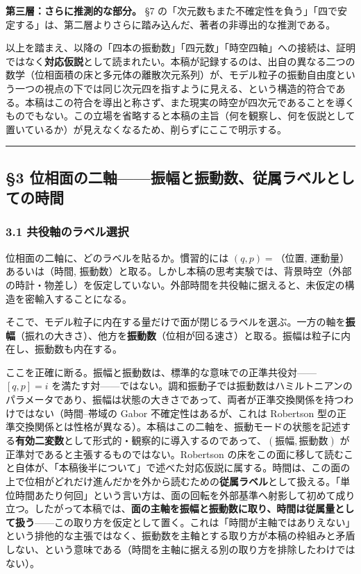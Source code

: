 \documentclass[
]{ltjsarticle}
\begin{document}
\textbf{第三層：さらに推測的な部分。} §7
の「次元数もまた不確定性を負う」「四で安定する」は、第二層よりさらに踏み込んだ、著者の非導出的な推測である。

以上を踏まえ、以降の「四本の振動数」「四元数」「時空四軸」への接続は、証明ではなく\textbf{対応仮説}として読まれたい。本稿が記録するのは、出自の異なる二つの数学（位相面積の床と多元体の離散次元系列）が、モデル粒子の振動自由度という一つの視点の下では同じ次元四を指すように見える、という構造的符合である。本稿はこの符合を導出と称さず、また現実の時空が四次元であることを導くものでもない。この立場を省略すると本稿の主旨（何を観察し、何を仮説として置いているか）が見えなくなるため、削らずにここで明示する。

\begin{center}\rule{0.5\linewidth}{0.5pt}\end{center}

\subsection{§3
位相面の二軸------振幅と振動数、従属ラベルとしての時間}\label{ux4f4dux76f8ux9762ux306eux4e8cux8ef8ux632fux5e45ux3068ux632fux52d5ux6570ux5f93ux5c5eux30e9ux30d9ux30ebux3068ux3057ux3066ux306eux6642ux9593}

\subsubsection{3.1
共役軸のラベル選択}\label{ux5171ux5f79ux8ef8ux306eux30e9ux30d9ux30ebux9078ux629e}

位相面の二軸に、どのラベルを貼るか。慣習的には \((q,p)=\)（位置,
運動量）あるいは（時間,
振動数）と取る。しかし本稿の思考実験では、背景時空（外部の時計・物差し）を仮定していない。外部時間を共役軸に据えると、未仮定の構造を密輸入することになる。

そこで、モデル粒子に内在する量だけで面が閉じるラベルを選ぶ。一方の軸を\textbf{振幅}（振れの大きさ）、他方を\textbf{振動数}（位相が回る速さ）と取る。振幅は粒子に内在し、振動数も内在する。

ここを正確に断る。振幅と振動数は、標準的な意味での正準共役対------\([q,p]=i\)
を満たす対------ではない。調和振動子では振動数はハミルトニアンのパラメータであり、振幅は状態の大きさであって、両者が正準交換関係を持つわけではない（時間--帯域の
Gabor 不確定性はあるが、これは Robertson
型の正準交換関係とは性格が異なる）。本稿はこの二軸を、振動モードの状態を記述する\textbf{有効二変数}として形式的・観察的に導入するのであって、\((振幅, 振動数)\)
が正準対であると主張するものではない。Robertson
の床をこの面に移して読むこと自体が、「本稿後半について」で述べた対応仮説に属する。時間は、この面の上で位相がどれだけ進んだかを外から読むための\textbf{従属ラベル}として扱える。「単位時間あたり何回」という言い方は、面の回転を外部基準へ射影して初めて成り立つ。したがって本稿では、\textbf{面の主軸を振幅と振動数に取り、時間は従属量として扱う}------この取り方を仮定として置く。これは「時間が主軸ではありえない」という排他的な主張ではなく、振動数を主軸とする取り方が本稿の枠組みと矛盾しない、という意味である（時間を主軸に据える別の取り方を排除したわけではない）。
\end{document}
